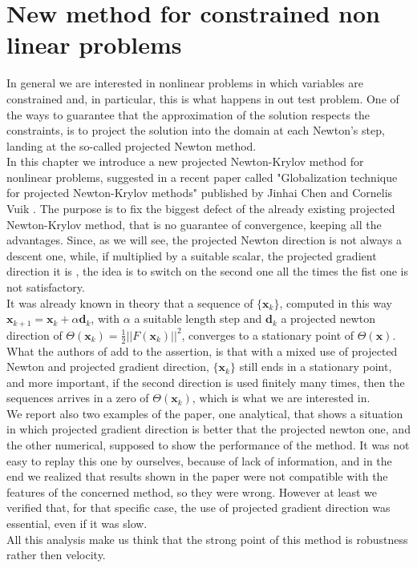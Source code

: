 \chapter{New method for constrained non linear problems}
In general we are interested in nonlinear problems in which variables are constrained and, in particular, this is what happens in out test problem.  One of the ways to guarantee that the approximation of the solution respects the constraints, is to project the solution into the domain at each Newton's step, landing at the so-called projected Newton method.\\
 In this chapter we introduce a new projected Newton-Krylov method for nonlinear problems, suggested in a recent paper called "Globalization technique for projected Newton-Krylov methods" published by Jinhai Chen and Cornelis Vuik \cite{MAIN}. The purpose is to fix the biggest defect of the already existing projected Newton-Krylov method, that is no guarantee of convergence, keeping all the advantages. Since, as we will see, the projected Newton direction is not always a descent one, while, if multiplied by a suitable scalar, the projected gradient direction it is , the idea is to switch on the second one all the times the fist one is not satisfactory.\\
 It was already known in theory that a sequence of $\{ \textbf{x}_k\} $, computed in this way $ \textbf{x}_{k+1} = \textbf{x}_{k} + \alpha \textbf{d}_k $, with $ \alpha $ a suitable length step and $ \textbf{d}_k $ a projected newton direction of $ \Theta (\textbf{x}_k) = \frac{1}{2} ||F (\textbf{x}_k)||^2$, converges to a stationary point of $ \Theta (\textbf{x}) $. What the authors of \cite{MAIN} add to the assertion, is that with a mixed use of projected Newton and projected gradient direction, $ \{\textbf{x}_k\} $ still ends in a stationary point, and more important, if the second direction is used finitely many times, then the sequences arrives in a zero of $ \Theta(\textbf{x}_k) $, which is what we are interested in.\\
 We report also two examples of the paper, one analytical, that shows a situation in which projected gradient direction is better that the projected newton one, and the other numerical, supposed to show the performance of the method. It was not easy to replay this one by ourselves, because of lack of information, and in the end we realized that results shown in the paper were not compatible with the features of the concerned method, so they were wrong. However at least we verified that, for that specific case, the use of projected gradient direction was essential, even if it was slow.\\
 All this analysis make us think that the strong point of this method is robustness rather then velocity.   

